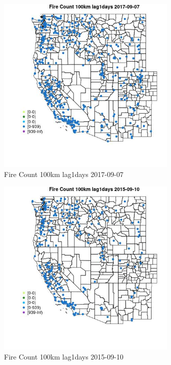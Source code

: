 \begin{figure} 
\centering  
\includegraphics[width=0.77\textwidth]{Code_Outputs/Report_ML_input_PM25_Step4_part_e_de_duplicated_aves_compiled_2019-05-21wNAs_MapObsFire_Count_100km_lag1days2017-09-07.jpg} 
\caption{\label{fig:Report_ML_input_PM25_Step4_part_e_de_duplicated_aves_compiled_2019-05-21wNAsMapObsFire_Count_100km_lag1days2017-09-07}Fire Count 100km lag1days 2017-09-07} 
\end{figure} 
 

\begin{figure} 
\centering  
\includegraphics[width=0.77\textwidth]{Code_Outputs/Report_ML_input_PM25_Step4_part_e_de_duplicated_aves_compiled_2019-05-21wNAs_MapObsFire_Count_100km_lag1days2015-09-10.jpg} 
\caption{\label{fig:Report_ML_input_PM25_Step4_part_e_de_duplicated_aves_compiled_2019-05-21wNAsMapObsFire_Count_100km_lag1days2015-09-10}Fire Count 100km lag1days 2015-09-10} 
\end{figure} 
 

